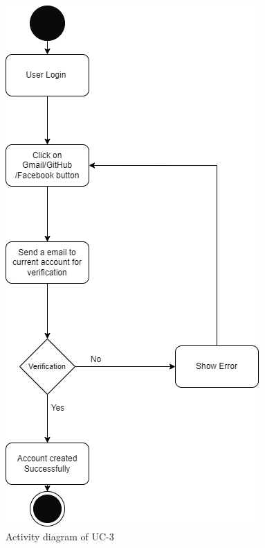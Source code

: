 \begin{figure}[H]
    \centering
    \includegraphics[scale=0.5]{./diagrams/Activity Diagram/ad-03.png}
    \caption{Activity diagram of UC-3}
    \label{fig:act-03}

\end{figure}


